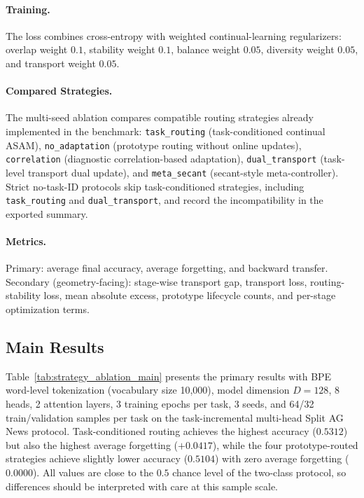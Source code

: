 \documentclass[11pt,a4paper]{article}
\theoremstyle{definition}
\begin{document}
\paragraph{Training.} The loss combines cross-entropy with weighted continual-learning regularizers: overlap weight $0.1$, stability weight $0.1$, balance weight $0.05$, diversity weight $0.05$, and transport weight $0.05$.

\paragraph{Compared Strategies.} The multi-seed ablation compares compatible routing strategies already implemented in the benchmark: \texttt{task\_routing} (task-conditioned continual ASAM), \texttt{no\_adaptation} (prototype routing without online updates), \texttt{correlation} (diagnostic correlation-based adaptation), \texttt{dual\_transport} (task-level transport dual update), and \texttt{meta\_secant} (secant-style meta-controller). Strict no-task-ID protocols skip task-conditioned strategies, including \texttt{task\_routing} and \texttt{dual\_transport}, and record the incompatibility in the exported summary.

\paragraph{Metrics.} Primary: average final accuracy, average forgetting, and backward transfer. Secondary (geometry-facing): stage-wise transport gap, transport loss, routing-stability loss, mean absolute excess, prototype lifecycle counts, and per-stage optimization terms.

\subsection{Main Results}

Table~\ref{tab:strategy_ablation_main} presents the primary results with BPE word-level tokenization (vocabulary size 10,000), model dimension $D=128$, 8 heads, 2 attention layers, 3 training epochs per task, 3 seeds, and 64/32 train/validation samples per task on the task-incremental multi-head Split AG News protocol. Task-conditioned routing achieves the highest accuracy ($0.5312$) but also the highest average forgetting ($+0.0417$), while the four prototype-routed strategies achieve slightly lower accuracy ($0.5104$) with zero average forgetting ($0.0000$). All values are close to the $0.5$ chance level of the two-class protocol, so differences should be interpreted with care at this sample scale.
\end{document}
